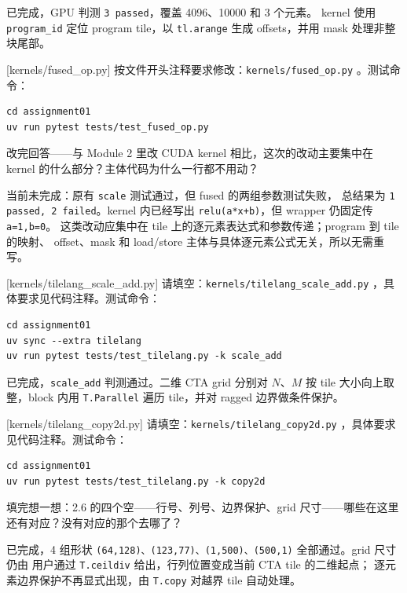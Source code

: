 \documentclass[11pt,a4paper,fontset=fandol]{ctexart}
\begin{document}
\begin{answer}
已完成，GPU 判测 \texttt{3 passed}，覆盖 4096、10000 和 3 个元素。
kernel 使用 \texttt{program\_id} 定位 program tile，以
\texttt{tl.arange} 生成 offsets，并用 mask 处理非整块尾部。
\end{answer}

[kernels/fused\_op.py]
按文件开头注释要求修改：\texttt{kernels/fused\_op.py} 。测试命令：

\begin{lstlisting}
cd assignment01
uv run pytest tests/test_fused_op.py
\end{lstlisting}

改完回答——与 Module 2 里改 CUDA kernel 相比，这次的改动主要集中在 kernel 的什么部分？主体代码为什么一行都不用动？

\begin{answer}
当前未完成：原有 \texttt{scale} 测试通过，但 fused 的两组参数测试失败，
总结果为 \texttt{1 passed, 2 failed}。kernel 内已经写出
\texttt{relu(a*x+b)}，但 wrapper 仍固定传 \texttt{a=1,b=0}。
这类改动应集中在 tile 上的逐元素表达式和参数传递；program 到 tile 的映射、
offset、mask 和 load/store 主体与具体逐元素公式无关，所以无需重写。
\end{answer}

[kernels/tilelang\_scale\_add.py]
请填空：\texttt{kernels/tilelang\_scale\_add.py} ，具体要求见代码注释。测试命令：

\begin{lstlisting}
cd assignment01
uv sync --extra tilelang
uv run pytest tests/test_tilelang.py -k scale_add
\end{lstlisting}

\begin{answer}
已完成，\texttt{scale\_add} 判测通过。二维 CTA grid 分别对 $N$、$M$
按 tile 大小向上取整，block 内用 \texttt{T.Parallel} 遍历 tile，并对
ragged 边界做条件保护。
\end{answer}

[kernels/tilelang\_copy2d.py]
请填空：\texttt{kernels/tilelang\_copy2d.py} ，具体要求见代码注释。测试命令：

\begin{lstlisting}
cd assignment01
uv run pytest tests/test_tilelang.py -k copy2d
\end{lstlisting}

填完想一想：2.6 的四个空——行号、列号、边界保护、grid 尺寸——哪些在这里还有对应？没有对应的那个去哪了？

\begin{answer}
已完成，4 组形状
\texttt{(64,128)、(123,77)、(1,500)、(500,1)} 全部通过。grid 尺寸仍由
用户通过 \texttt{T.ceildiv} 给出，行列位置变成当前 CTA tile 的二维起点；
逐元素边界保护不再显式出现，由 \texttt{T.copy} 对越界 tile 自动处理。
\end{answer}
\end{document}
